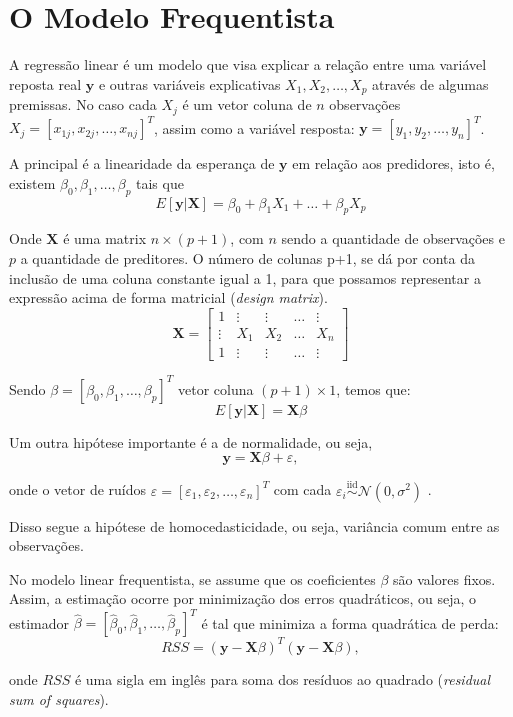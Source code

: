\documentclass[12pt,letterpaper]{article}
\newcommand{\bd}[1]{\boldsymbol{#1}}
\newcommand{\rs}{X_1, X_2, \ldots, X_p} %
\newcommand{\eps}{\varepsilon}
\newcommand{\norm}{\mathcal{N}}
\newcommand{\iid}{\overset{\text{iid}}{\sim}}
\begin{document}
	\section{O Modelo Frequentista}
	
	A regressão linear é um modelo que visa explicar a relação entre uma variável reposta real $\bd y$ e outras variáveis explicativas $\rs$ através de algumas premissas. No caso cada $X_j$ é um vetor coluna de $n$ observações $X_j = [x_{1j},x_{2j},\ldots,x_{nj}]^T$, assim como a variável resposta: $\bd y=[y_1,y_2,\ldots,y_n]^T$.
	
	A principal é a linearidade da esperança de $\bd y$ em relação aos predidores, isto é, existem $\beta_0,\beta_1,\ldots,\beta_p$ tais que 
	$$E[\bd y|\bd X]=\beta_0+\beta_1X_1+\ldots+\beta_pX_p$$
	
	Onde $\bd X$ é uma matrix $n\times(p+1)$, com $n$ sendo a quantidade de observações e $p$ a quantidade de preditores. O número de colunas p+1, se dá por conta da inclusão de uma coluna constante igual a 1, para que possamos representar a expressão acima de forma matricial (\textit{design matrix}).
	$$\bd X=
	\begin{bmatrix}
		1 & \vdots & \vdots & \ldots &\vdots\\
		\vdots & X_1 & X_2 & \ldots & X_n\\
		1 &\vdots & \vdots & \ldots &\vdots
	\end{bmatrix}$$

	Sendo $\beta=[\beta_0,\beta_1,\ldots,\beta_p]^T$ vetor coluna $(p+1)\times 1$, temos que:
	$$E[\bd y|\bd X]=\bd X\beta$$
	
	Um outra hipótese importante é a de normalidade, ou seja,
	$$\bd y=\bd X\beta+\varepsilon,$$
	
	onde o vetor de ruídos $\varepsilon=[\varepsilon_1,\varepsilon_2,\ldots,\varepsilon_n]^T$ com cada $\eps_i\iid \norm(0,\sigma^2)$ .
	
	Disso segue a hipótese de homocedasticidade, ou seja, variância comum entre as observações.
	
	No modelo linear frequentista, se assume que os coeficientes $\beta$ são valores fixos. Assim, a estimação ocorre por minimização dos erros quadráticos, ou seja, o estimador $\hat\beta=[\hat\beta_0,\hat\beta_1,\ldots,\hat\beta_p]^T$ é tal que minimiza a forma quadrática de perda:
	$$RSS = (\bd y-\bd X \beta)^T(\bd y-\bd X\beta),$$
	
	onde $RSS$ é uma sigla em inglês para soma dos resíduos ao quadrado (\textit{residual sum of squares}).
	
\end{document}
